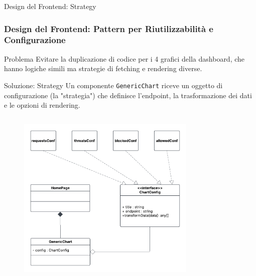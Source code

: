 \documentclass[8pt]{beamer}
\begin{document}
\begin{frame}[fragile]{Design del Frontend: Strategy}
  \frametitle{Design del Frontend: Pattern per Riutilizzabilità e Configurazione}
  \begin{alertblock}{Problema }
    Evitare la duplicazione di codice per i 4 grafici della dashboard, che hanno logiche simili ma strategie di fetching e rendering diverse.
  \end{alertblock}
  \begin{block}{Soluzione: Strategy }
    Un componente \texttt{GenericChart} riceve un oggetto di configurazione (la "strategia") che definisce l'endpoint, la trasformazione dei dati e le opzioni di rendering.
  \end{block}
  \begin{columns}[T]
    \begin{figure}
      \includegraphics[width=\textwidth]{figures/strategy.pdf}
    \end{figure}
    \begin{figure}

\end{figure}
\end{columns}
\end{frame}
\end{document}
